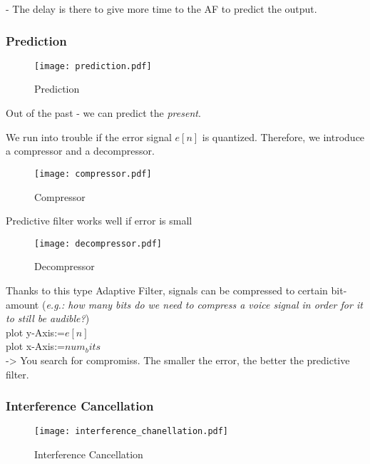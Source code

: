 - The delay is there to give more time to the AF to predict the output. 

\subsubsection{Prediction}
\begin{figure}[H]
	\centering
	\texttt{[image: prediction.pdf]}
	\caption{Prediction}
	\label{prediction} 
\end{figure}

Out of the past - we can predict the \textit{present}. 

We run into trouble if the error signal $e[n]$ is quantized. Therefore, we introduce a compressor and a decompressor. 

\begin{figure}[H]
	\centering
	\texttt{[image: compressor.pdf]}
	\caption{Compressor}
	\label{compressor} 
\end{figure}

Predictive filter works well \pfeil if error is small\\

\begin{figure}[H]
	\centering
	\texttt{[image: decompressor.pdf]}
	\caption{Decompressor}
	\label{decompressor} 
\end{figure}

Thanks to this type Adaptive Filter, signals can be compressed to certain bit-amount (\textit{e.g.: how many bits do we need to compress a voice signal in order for it to still be audible?})\\

\pfeil plot y-Axis:=$e[n]$\\
\pfeil plot x-Axis:=$num_bits$\\ 

-> You search for compromiss. The smaller the error, the better the predictive filter.


\subsubsection{Interference Cancellation}

\begin{figure}[H]
	\centering
	\texttt{[image: interference\_chanellation.pdf]}
	\caption{Interference Cancellation}
	\label{interference1} 
\end{figure}

